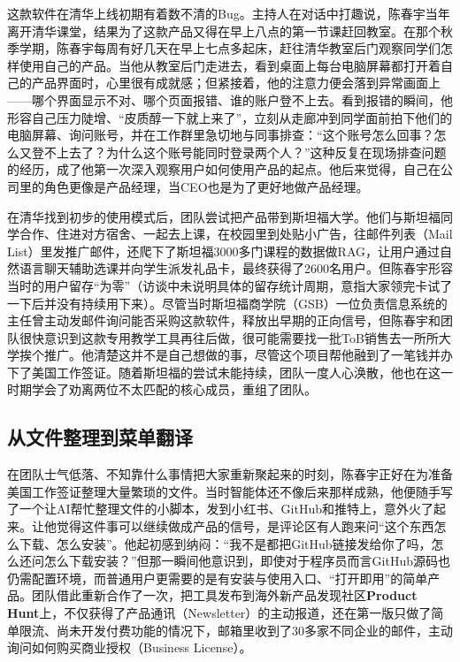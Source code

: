 \documentclass[UTF8,a4paper,11pt,fontset=fandol]{ctexart}
\begin{document}
这款软件在清华上线初期有着数不清的Bug。主持人在对话中打趣说，陈春宇当年离开清华课堂，结果为了这款产品又得在早上八点的第一节课赶回教室。在那个秋季学期，陈春宇每周有好几天在早上七点多起床，赶往清华教室后门观察同学们怎样使用自己的产品。当他从教室后门走进去，看到桌面上每台电脑屏幕都打开着自己的产品界面时，心里很有成就感；但紧接着，他的注意力便会落到异常画面上——哪个界面显示不对、哪个页面报错、谁的账户登不上去。看到报错的瞬间，他形容自己压力陡增、“皮质醇一下就上来了”，立刻从走廊冲到同学面前拍下他们的电脑屏幕、询问账号，并在工作群里急切地与同事排查：“这个账号怎么回事？怎么又登不上去了？为什么这个账号能同时登录两个人？”这种反复在现场排查问题的经历，成了他第一次深入观察用户如何使用产品的起点。他后来觉得，自己在公司里的角色更像是产品经理，当CEO也是为了更好地做产品经理。

在清华找到初步的使用模式后，团队尝试把产品带到斯坦福大学。他们与斯坦福同学合作、住进对方宿舍、一起去上课，在校园里到处贴小广告，往邮件列表（Mail List）里发推广邮件，还爬下了斯坦福3000多门课程的数据做RAG，让用户通过自然语言聊天辅助选课并向学生派发礼品卡，最终获得了2600名用户。但陈春宇形容当时的用户留存“为零”（访谈中未说明具体的留存统计周期，意指大家领完卡试了一下后并没有持续用下来）。尽管当时斯坦福商学院（GSB）一位负责信息系统的主任曾主动发邮件询问能否采购这款软件，释放出早期的正向信号，但陈春宇和团队很快意识到这款专用教学工具再往后做，很可能需要找一批ToB销售去一所所大学挨个推广。他清楚这并不是自己想做的事，尽管这个项目帮他融到了一笔钱并办下了美国工作签证。随着斯坦福的尝试未能持续，团队一度人心涣散，他也在这一时期学会了劝离两位不太匹配的核心成员，重组了团队。

\subsection{从文件整理到菜单翻译}
在团队士气低落、不知靠什么事情把大家重新聚起来的时刻，陈春宇正好在为准备美国工作签证整理大量繁琐的文件。当时智能体还不像后来那样成熟，他便随手写了一个让AI帮忙整理文件的小脚本，发到小红书、GitHub和推特上，意外火了起来。让他觉得这件事可以继续做成产品的信号，是评论区有人跑来问“这个东西怎么下载、怎么安装”。他起初感到纳闷：“我不是都把GitHub链接发给你了吗，怎么还问怎么下载安装？”但那一瞬间他意识到，即使对于程序员而言GitHub源码也仍需配置环境，而普通用户更需要的是有安装与使用入口、“打开即用”的简单产品。团队借此重新合作了一次，把工具发布到海外新产品发现社区\textbf{Product Hunt}上，不仅获得了产品通讯（Newsletter）的主动报道，还在第一版只做了简单限流、尚未开发付费功能的情况下，邮箱里收到了30多家不同企业的邮件，主动询问如何购买商业授权（Business License）。
\end{document}
